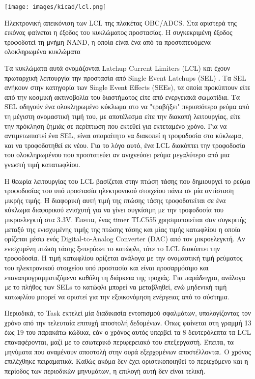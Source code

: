 \documentclass[a4paper,nobib,justified]{tufte-book}
\begin{document}
\begin{marginfigure}
	\centering
	\texttt{[image: images/kicad/lcl.png]}
	\caption[Ηλεκτρονική απεικόνιση των LCL]{Ηλεκτρονική απεικόνιση των LCL της πλακέτας OBC/ADCS. Στα αριστερά της εικόνας φαίνεται η έξοδος του κυκλώματος προστασίας. Η συγκεκριμένη έξοδος τροφοδοτεί τη μνήμη NAND, η οποία είναι ένα από τα προστατευόμενα ολοκληρωμένα κυκλώματα }
	\label{fig:schematic-lcl}
\end{marginfigure}
Τα κυκλώματα αυτά ονομάζονται Latchup Current Limiters (LCL) και έχουν πρωταρχική λειτουργία την προστασία από Single Event Latchups (SEL) . Tα SEL ανήκουν στην κατηγορία των Single Event Effects (SEEs), τα οποία προκύπτουν είτε από την κοσμική ακτινοβολία του διαστήματος είτε από ενεργειακά σωματίδια. Tα SEL οδηγούν ένα ολοκληρωμένο κύκλωμα στο να "τραβήξει" περισσότερο ρεύμα από τη μέγιστη ονομαστική τιμή του, με αποτέλεσμα είτε την διακοπή λειτουργίας, είτε την πρόκληση ζημιάς σε περίπτωση που εκτεθεί για εκτεταμένο χρόνο. Για να αντιμετωπιστεί ένα SEL, είναι απαραίτητο να διακοπεί η τροφοδοσία στο κύκλωμα, και να τροφοδοτηθεί εκ νέου. Για το λόγο αυτό, ένα LCL διακόπτει την τροφοδοσία του ολοκληρωμένου που προστατεύει αν ανιχνεύσει ρεύμα μεγαλύτερο από μια γνωστή τιμή κατατωφλίου.

Η θεωρία λειτουργίας του LCL βασίζεται στην πτώση τάσης που δημιουργεί το ρεύμα τροφοδοσίας του υπό προστασία ηλεκτρονικού στοιχείου πάνω σε μία αντίσταση μικρής τιμής. Η διαφορική αυτή τιμή της πτώσης τάσης τροφοδοτείται σε ένα κύκλωμα διαφορικού ενισχυτή για να γίνει συγκίσιμη με την τροφοδοσία του μικροελεγκτή στα 3.3V. Έπειτα, ένας timer TLC555 χρησιμοποιείται σαν συγκριτής μεταξύ της ενισχυμένης τιμής της πτώσης τάσης και μίας τιμής κατωφλίου η οποία ορίζεται μέσω ενός Digital-to-Analog Converter (DAC) από τον μικροελεγκτή. Αν ενισχυμένη πτώση τάσης ξεπεράσει το κατώφλι, τότε το LCL διακόπτει την τροφοδοσία. Η τιμή κατωφλίου ορίζεται ανάλογα με την ονομαστική τιμή ρεύματος του ηλεκτρονικού στοιχείου υπό προστασία και είναι προσαρμόσιμο και επαναπρογραμματιζόμενο καθόλη τη διάρκεια της τροχιάς. Για παράδειγμα, ανάλογα με το πλήθος των SELs το κατώφλι μπορεί να μεταβληθεί, ενώ μηδενική τιμή κατωφλίου μπορεί να οριστεί για την εξοικονόμηση ενέργειας από το σύστημα.

\marginnote{
}
Περιοδικά, το Task εκτελεί μία διαδικασία εντοπισμού σφαλμάτων, υπολογίζοντας τον χρόνο από την τελευταία επιτυχή αποστολή δεδομένων. Όπως φαίνεται στη γραμμή 13 έως 19 του παρακάτω κώδικα, εάν ο χρόνος αυτός υπερβεί τα 8 δευτερόλεπτα τα LCL επαναφέρονται, μαζί με το εσωτερικό περιφερειακό του επεξεργαστή. Έπειτα, τα μηνύματα που αναμένουν αποστολή στην ουρά εξερχομένων αποστέλλονται. Ο χρόνος επιλέχθηκε πειραματικά. Καθώς ακόμα δεν έχει οριστικοποιηθεί το περιεχόμενο και η περίοδος των περιοδικών μηνυμάτων, η επιλογή αυτή δεν είναι τελική.
\end{document}
